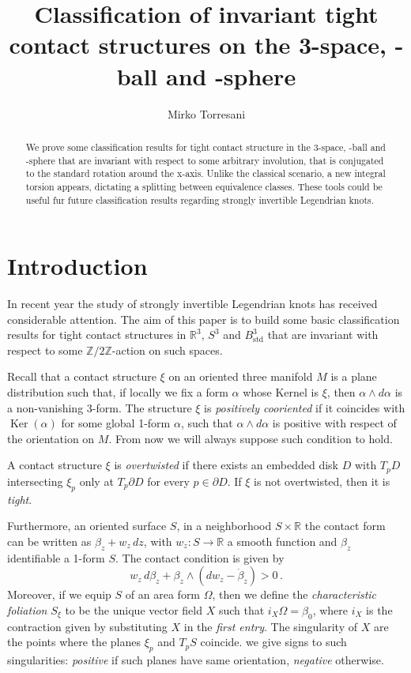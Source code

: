 \documentclass[a4paper, 11pt]{amsart}
\theoremstyle{plain}
\theoremstyle{definition}
\newcommand{\R}{\mathbb{R}}
\newcommand{\sd}{\text{std}}
\newcommand{\Z}{\mathbb{Z}}
\DeclareMathOperator{\Ker}{Ker}
\begin{document}
\title[Invariant tight contact structures]{Classification of invariant tight contact structures on the 3-space, -ball and -sphere}
\author{Mirko Torresani}
\address{DIMAI, viale Giovan Battista Morgagni 67/a, 50134, Firenze, Italy}
\begin{abstract}
	We prove some classification results for tight contact structure in the 3-space, -ball and -sphere that are invariant with respect to some arbitrary involution, that is conjugated to the standard rotation around the x-axis. Unlike the classical scenario, a new integral torsion appears, dictating a splitting between equivalence classes. These tools could be useful fur future classification results regarding strongly invertible Legendrian knots.
\end{abstract}
\maketitle
\tableofcontents
\section{Introduction}\label{sec:introdution}
In recent year the study of strongly invertible Legendrian knots has received considerable attention. The aim of this paper is to build some basic classification results for tight contact structures in $\R^3$, $S^3$ and $B^3_{\sd}$ that are invariant with respect to some $\Z/2\Z$-action on such spaces. 


Recall that a contact structure $\xi$ on an oriented three manifold $M$ is a plane distribution such that, if locally we fix a form $\alpha$ whose Kernel is $\xi$, then $\alpha \wedge d\alpha$ is a non-vanishing 3-form. The structure $\xi$ is \emph{positively cooriented} if it coincides with $\Ker(\alpha)$ for some global 1-form $\alpha$, such that $\alpha \wedge d\alpha$ is positive with respect of the orientation on $M$. From now we will always suppose such condition to hold.

A contact structure $\xi$ is \emph{overtwisted} if there exists an embedded disk $D$ with $T_pD$ intersecting $\xi_p$ only at $T_p\partial D$ for every $p \in \partial D$. If $\xi$ is not overtwisted, then it is \emph{tight}.

Furthermore, an oriented surface $S$, in a neighborhood $S \times \R$ the contact form can be written as $\beta_z + w_z\,dz$, with $w_z \colon S \to \R$ a smooth function and $\beta_z$ identifiable a 1-form $S$. The contact condition is given by
\begin{equation}\label{eq:contcond}
	w_z \,d\beta_z +\beta_z \wedge(dw_z - \dot{\beta}_z) > 0\,.
\end{equation}
Moreover, if we equip $S$ of an area form $\Omega$, then we define the \emph{characteristic foliation} $S_\xi$ to be the unique vector field $X$ such that $i_X\Omega = \beta_0$, where $i_X$ is the contraction given by substituting $X$ in the \emph{first entry}. The singularity of $X$ are the points where the planes $\xi_p$ and $T_pS$ coincide. we give signs to such singularities: \emph{positive} if such planes have same orientation, \emph{negative} otherwise.
\end{document}
